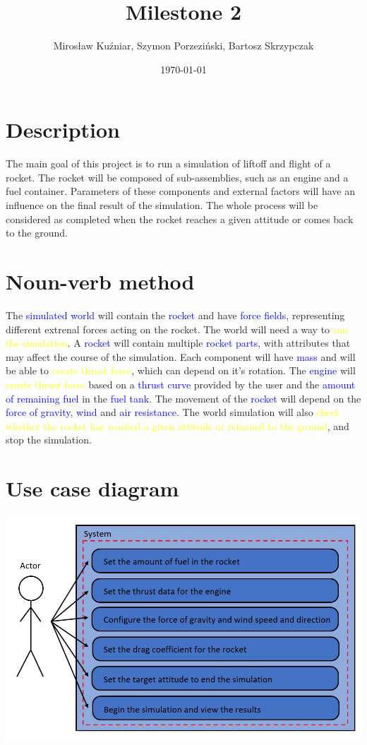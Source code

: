 \documentclass{article}
\title{Milestone 2}
\author{Mirosław Kuźniar, Szymon Porzeziński, Bartosz Skrzypczak }
\date{\today}
\begin{document}
\maketitle

\section{Description}
The main goal of this project is to run a simulation of liftoff and flight of a rocket. The rocket will be composed of sub-assemblies, such as an engine and a fuel container. Parameters of these components and external factors will have an influence on the final result of the simulation. The whole process will be considered as completed when the rocket reaches a given attitude or comes back to the ground. 

\section{Noun-verb method}
The \textcolor{blue}{simulated world} will contain the \textcolor{blue}{rocket} and have \textcolor{blue}{force fields}, representing different extrenal forces acting on the rocket. The world will need a way to \textcolor{yellow}{run the simulation}. A \textcolor{blue}{rocket} will contain multiple \textcolor{blue}{rocket parts}, with attributes that may affect the course of the simulation. Each component will have \textcolor{blue}{mass} and will be able to \textcolor{yellow}{create thrust force}, which can depend on it's rotation. The \textcolor{blue}{engine} will \textcolor{yellow}{create thrust force} based on a \textcolor{blue}{thrust curve} provided by the user and the \textcolor{blue}{amount of remaining fuel} in the \textcolor{blue}{fuel tank}. The movement of the \textcolor{blue}{rocket} will depend on the \textcolor{blue}{force of gravity}, \textcolor{blue}{wind} and \textcolor{blue}{air resistance}. The world simulation will also \textcolor{yellow}{check whether the rocket has reached a given attitude or returned to the ground}, and stop the simulation.

\section{Use case diagram}
\includegraphics[width=17cm,center]{use_case_diagram.png}
\vspace{5cm}
\end{document}
